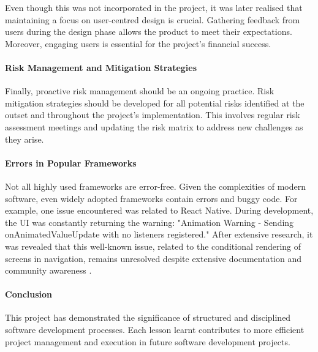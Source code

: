 Even though this was not incorporated in the project, it was later realised that maintaining a focus on user-centred design is crucial. Gathering feedback from users during the design phase allows the product to meet their expectations. Moreover, engaging users is essential for the project's financial success.

\paragraph{Risk Management and Mitigation Strategies}

Finally, proactive risk management should be an ongoing practice. Risk mitigation strategies should be developed for all potential risks identified at the outset and throughout the project's implementation. This involves regular risk assessment meetings and updating the risk matrix to address new challenges as they arise. 

\paragraph{Errors in Popular Frameworks}

Not all highly used frameworks are error-free. Given the complexities of modern software, even widely adopted frameworks contain errors and buggy code. For example, one issue encountered was related to React Native. During development, the UI was constantly returning the warning: "Animation Warning - Sending onAnimatedValueUpdate with no listeners registered." After extensive research, it was revealed that this well-known issue, related to the conditional rendering of screens in navigation, remains unresolved despite extensive documentation and community awareness \cite{GithubAnimatedViewWarning, StackOverFlowAnimatedViewWarning}.

\paragraph{Conclusion}

This project has demonstrated the significance of structured and disciplined software development processes. Each lesson learnt contributes to more efficient project management and execution in future software development projects.